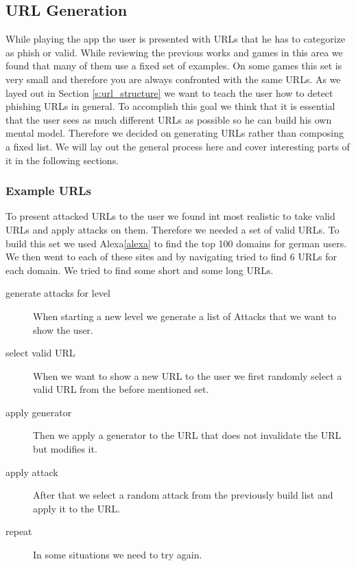 \subsection{URL Generation}
While playing the app the user is presented with URLs that he has to categorize as phish or valid.
While reviewing the previous works and games in this area we found that many of them use a fixed set of examples.
On some games this set is very small and therefore you are always confronted with the same URLs.
As we layed out in Section \ref{s:url_structure} we want to teach the user how to detect phishing URLs in general.
To accomplish this goal we think that it is essential that the user sees as much different URLs as possible so he can build his own mental model.
Therefore we decided on generating URLs rather than composing a fixed list.
We will lay out the general process here and cover interesting parts of it in the following sections.
\subsubsection{Example URLs}
To present attacked URLs to the user we found int most realistic to take valid URLs and apply attacks on them.
Therefore we needed a set of valid URLs.
To build this set we used Alexa\ref{alexa} to find the top 100 domains for german users.
We then went to each of these sites and by navigating tried to find 6 URLs for each domain.
We tried to find some short and some long URLs.
\begin{description}
\item[generate attacks for level]When starting a new level we generate a list of Attacks that we want to show the user.
\item[select valid URL]When we want to show a new URL to the user we first randomly select a valid URL from the before mentioned set.
\item[apply generator]Then we apply a generator to the URL that does not invalidate the URL but modifies it.
\item[apply attack]After that we select a random attack from the previously build list and apply it to the URL.
\item[repeat]In some situations we need to try again.
\end{description}
